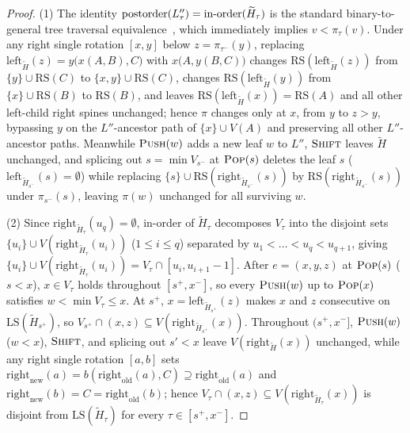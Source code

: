 \documentclass[11pt]{article}
\theoremstyle{definition}
\theoremstyle{remark}
\newcommand{\LS}{\mathrm{LS}}
\newcommand{\RS}{\mathrm{RS}}
\newcommand{\PUSH}{\textnormal{\scshape Push}}
\newcommand{\POP}{\textnormal{\scshape Pop}}
\newcommand{\SHIFT}{\textnormal{\scshape Shift}}
\begin{document}
\begin{proof}
(1) The identity $\mathrm{postorder}(L''_\tau) = \textnormal{in-order}(\widetilde{H}_\tau)$ is the standard binary-to-general tree traversal equivalence~\cite[Section~2.3.2]{Knuth1997Vol1}, which immediately implies $v < \pi_\tau(v)$. Under any right single rotation $[x, y]$ below $z = \pi_{\tau^-}(y)$, replacing $\mathrm{left}_{\widetilde{H}}(z) = y\big(x(A, B), C\big)$ with $x\big(A, y(B, C)\big)$ changes $\RS(\mathrm{left}_{\widetilde{H}}(z))$ from $\{y\} \cup \RS(C)$ to $\{x, y\} \cup \RS(C)$, changes $\RS(\mathrm{left}_{\widetilde{H}}(y))$ from $\{x\} \cup \RS(B)$ to $\RS(B)$, and leaves $\RS(\mathrm{left}_{\widetilde{H}}(x)) = \RS(A)$ and all other left-child right spines unchanged; hence $\pi$ changes only at $x$, from $y$ to $z > y$, bypassing $y$ on the $L''$-ancestor path of $\{x\} \cup V(A)$ and preserving all other $L''$-ancestor paths. Meanwhile $\PUSH(w)$ adds a new leaf $w$ to $L''$, $\SHIFT$ leaves $\widetilde{H}$ unchanged, and splicing out $s = \min V_{s^-}$ at $\POP(s)$ deletes the leaf $s$ ($\mathrm{left}_{\widetilde{H}_{s^-}}(s) = \emptyset$) while replacing $\{s\} \cup \RS(\mathrm{right}_{\widetilde{H}_{s^-}}(s))$ by $\RS(\mathrm{right}_{\widetilde{H}_{s^-}}(s))$ under $\pi_{s^-}(s)$, leaving $\pi(w)$ unchanged for all surviving $w$.

(2) Since $\mathrm{right}_{\widetilde{H}_\tau}(u_q) = \emptyset$, in-order of $\widetilde{H}_\tau$ decomposes $V_\tau$ into the disjoint sets $\{u_i\} \cup V(\mathrm{right}_{\widetilde{H}_\tau}(u_i))$ ($1 \le i \le q$) separated by $u_1 < \dots < u_q < u_{q+1}$, giving $\{u_i\} \cup V(\mathrm{right}_{\widetilde{H}_\tau}(u_i)) = V_\tau \cap [u_i, u_{i+1} - 1]$. After $e = (x, y, z)$ at $\POP(s)$ ($s < x$), $x \in V_\tau$ holds throughout $[s^+, x^-]$, so every $\PUSH(w)$ up to $\POP(x)$ satisfies $w < \min V_\tau \le x$. At $s^+$, $x = \mathrm{left}_{\widetilde{H}_{s^+}}(z)$ makes $x$ and $z$ consecutive on $\LS(\widetilde{H}_{s^+})$, so $V_{s^+} \cap (x, z) \subseteq V(\mathrm{right}_{\widetilde{H}_{s^+}}(x))$. Throughout $(s^+, x^-]$, $\PUSH(w)$ ($w < x$), $\SHIFT$, and splicing out $s' < x$ leave $V(\mathrm{right}_{\widetilde{H}}(x))$ unchanged, while any right single rotation $[a, b]$ sets $\mathrm{right}_{\mathrm{new}}(a) = b(\mathrm{right}_{\mathrm{old}}(a), C) \supseteq \mathrm{right}_{\mathrm{old}}(a)$ and $\mathrm{right}_{\mathrm{new}}(b) = C = \mathrm{right}_{\mathrm{old}}(b)$; hence $V_\tau \cap (x, z) \subseteq V(\mathrm{right}_{\widetilde{H}_\tau}(x))$ is disjoint from $\LS(\widetilde{H}_\tau)$ for every $\tau \in [s^+, x^-]$.


\end{proof}
\end{document}
